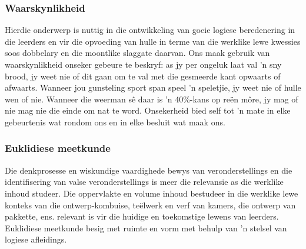 \subsubsection{Waarskynlikheid}
Hierdie onderwerp is nuttig in die ontwikkeling van goeie logiese beredenering in die leerders en vir die opvoeding van hulle in terme van die werklike lewe kwessies soos dobbelary en die moontlike slaggate daarvan. Ons maak gebruik van waarskynlikheid onseker gebeure te beskryf: as jy per ongeluk laat val 'n sny brood, jy weet nie of dit gaan om te val met die gesmeerde kant opwaarts of afwaarts. Wanneer jou gunsteling sport span speel 'n speletjie, jy weet nie of hulle wen of nie. Wanneer die weerman sê daar is 'n 40\%-kans op reën môre, jy mag of nie mag nie die einde om nat te word. Onsekerheid bied self tot 'n mate in elke gebeurtenis wat rondom ons en in elke besluit wat maak ons.

\subsubsection{Euklidiese meetkunde}
Die denkprosesse en wiskundige vaardighede bewys van veronderstellings en die identifisering van valse veronderstellings is meer die relevansie as die werklike inhoud studeer. Die oppervlakte en volume inhoud bestudeer in die werklike lewe konteks van die ontwerp-kombuise, teëlwerk en verf van kamers, die ontwerp van pakkette, ens.
relevant is vir die huidige en toekomstige lewens van leerders. Euklidiese meetkunde besig met ruimte en vorm met behulp van 'n stelsel van logiese afleidings.

